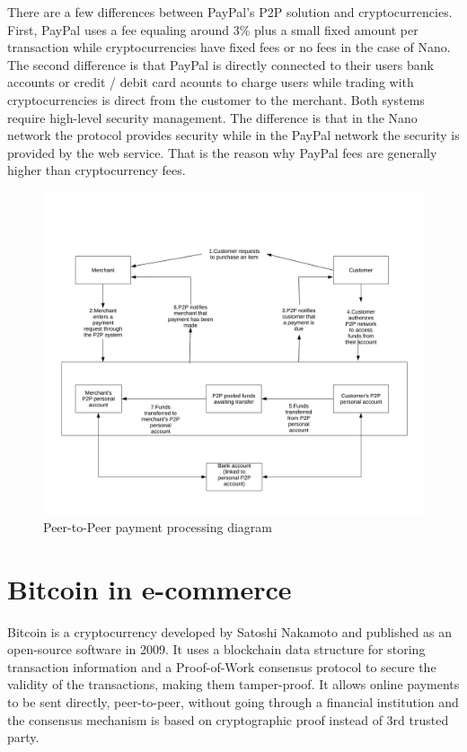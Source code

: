 \documentclass{ferseminar}
\begin{document}
There are a few differences between PayPal's P2P solution and cryptocurrencies. First, PayPal uses a fee equaling around 3\% plus a small fixed amount per transaction while cryptocurrencies have fixed fees or no fees in the case of Nano. The second difference is that PayPal is directly connected to their users bank accounts or credit / debit card acounts to charge users while trading with cryptocurrencies is direct from the customer to the merchant. Both systems require high-level security management. The difference is that in the Nano network the protocol provides security while in the PayPal network the security is provided by the web service. That is the reason why PayPal fees are generally higher than cryptocurrency fees.
\begin{figure}
	\caption{Peer-to-Peer payment processing diagram}
	\includegraphics[scale=0.6]{diagram3}
	\centering
\end{figure}


\section{Bitcoin in e-commerce}

Bitcoin is a cryptocurrency developed by Satoshi Nakamoto and published as an open-source software in 2009. It uses a blockchain data structure for storing transaction information and a Proof-of-Work consensus protocol to secure the validity of the transactions, making them tamper-proof. It allows online payments to be sent directly, peer-to-peer, without going through a financial institution and the consensus mechanism is based on cryptographic proof instead of 3rd trusted party.
\end{document}
